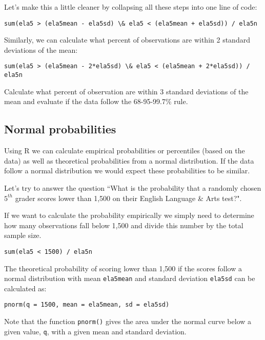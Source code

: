 \documentclass[11pt]{article}
\begin{document}
Let's make this a little cleaner by collapsing all these steps into one line of code:

\begin{lstlisting}
sum(ela5 > (ela5mean - ela5sd) \& ela5 < (ela5mean + ela5sd)) / ela5n
\end{lstlisting}

Similarly, we can calculate what percent of observations are within 2 standard deviations of the mean:

\begin{lstlisting}
sum(ela5 > (ela5mean - 2*ela5sd) \& ela5 < (ela5mean + 2*ela5sd)) / ela5n
\end{lstlisting}

\begin{exercise}
Calculate what percent of observation are within 3 standard deviations of the mean and evaluate if the data follow the 68-95-99.7\% rule.
\end{exercise}

%
\subsection*{Normal probabilities}

Using R we can calculate empirical probabilities or percentiles (based on the data) as well as theoretical probabilities from a normal distribution. If the data follow a normal distribution we would expect these probabilities to be similar.

Let's try to answer the question ``What is the probability that a randomly chosen $5^{th}$ grader scores lower than 1,500 on their English Language \& Arts test?".

If we want to calculate the probability empirically we simply need to determine how many observations fall below 1,500 and divide this number by the total sample size.

\begin{lstlisting}
sum(ela5 < 1500) / ela5n
\end{lstlisting}

The theoretical probability of scoring lower than 1,500 if the scores follow a normal distribution with mean \texttt{ela5mean} and standard deviation \texttt{ela5sd} can be calculated as:

\begin{lstlisting}
pnorm(q = 1500, mean = ela5mean, sd = ela5sd)
\end{lstlisting}

Note that the function \texttt{pnorm()} gives the area under the normal curve below a given value, \texttt{q}, with a given mean and standard deviation.
\end{document}
